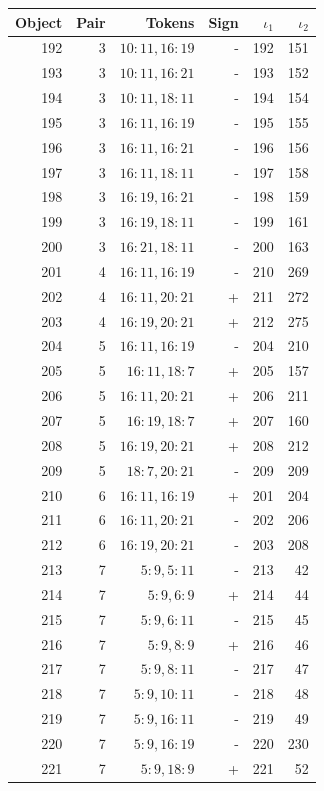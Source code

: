 \begin{center}\begin{tabular}{rrrrrr}\toprule Object & Pair & Tokens & Sign & $\iota_1$ & $\iota_2$\\\midrule
192 & 3 & $10:11,16:19$ & - & 192 & 151\\
193 & 3 & $10:11,16:21$ & - & 193 & 152\\
194 & 3 & $10:11,18:11$ & - & 194 & 154\\
195 & 3 & $16:11,16:19$ & - & 195 & 155\\
196 & 3 & $16:11,16:21$ & - & 196 & 156\\
197 & 3 & $16:11,18:11$ & - & 197 & 158\\
198 & 3 & $16:19,16:21$ & - & 198 & 159\\
199 & 3 & $16:19,18:11$ & - & 199 & 161\\
200 & 3 & $16:21,18:11$ & - & 200 & 163\\
201 & 4 & $16:11,16:19$ & - & 210 & 269\\
202 & 4 & $16:11,20:21$ & + & 211 & 272\\
203 & 4 & $16:19,20:21$ & + & 212 & 275\\
204 & 5 & $16:11,16:19$ & - & 204 & 210\\
205 & 5 & $16:11,18:7$ & + & 205 & 157\\
206 & 5 & $16:11,20:21$ & + & 206 & 211\\
207 & 5 & $16:19,18:7$ & + & 207 & 160\\
208 & 5 & $16:19,20:21$ & + & 208 & 212\\
209 & 5 & $18:7,20:21$ & - & 209 & 209\\
210 & 6 & $16:11,16:19$ & + & 201 & 204\\
211 & 6 & $16:11,20:21$ & - & 202 & 206\\
212 & 6 & $16:19,20:21$ & - & 203 & 208\\
213 & 7 & $5:9,5:11$ & - & 213 & 42\\
214 & 7 & $5:9,6:9$ & + & 214 & 44\\
215 & 7 & $5:9,6:11$ & - & 215 & 45\\
216 & 7 & $5:9,8:9$ & + & 216 & 46\\
217 & 7 & $5:9,8:11$ & - & 217 & 47\\
218 & 7 & $5:9,10:11$ & - & 218 & 48\\
219 & 7 & $5:9,16:11$ & - & 219 & 49\\
220 & 7 & $5:9,16:19$ & - & 220 & 230\\
221 & 7 & $5:9,18:9$ & + & 221 & 52\\

\end{tabular}
\end{center}
